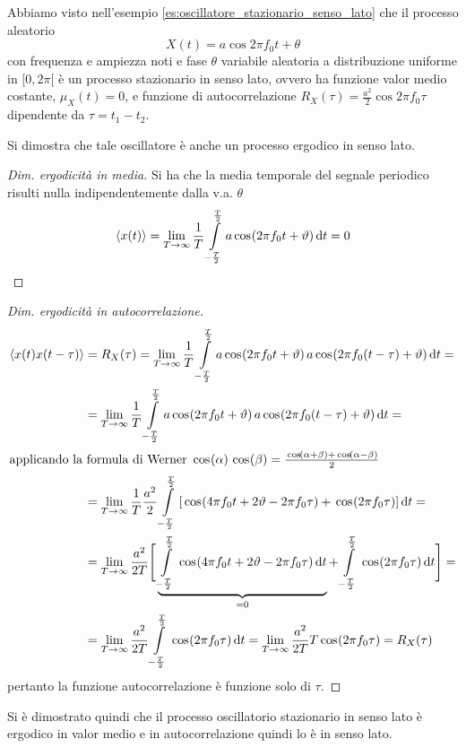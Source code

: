 \begin{esempio}
Abbiamo visto nell'esempio \ref{es:oscillatore_stazionario_senso_lato} che il processo aleatorio
\[
	X(t)=a\cos{2\pi f_0 t+\theta}
\]
con frequenza e ampiezza noti e fase $\theta$ variabile aleatoria a distribuzione uniforme in $[0,2\pi[$ è un processo stazionario in senso lato, ovvero ha funzione valor medio costante, $\mu_X(t)=0$, e funzione di autocorrelazione $R_X(\tau)=\frac{a^2}{2}\cos{2\pi f_0 \tau}$ dipendente da $\tau=t_1-t_2$.

Si dimostra che tale oscillatore è anche un processo ergodico in senso lato.
\begin{proof}[Dim. ergodicità in media]
Si ha che la media temporale del segnale periodico risulti nulla indipendentemente dalla v.a. $\theta$
\[
	\langle x(t)\rangle=\lim\limits_{T\to\infty}\frac{1}{T}\int\limits_{-\frac{T}{2}}^{\frac{T}{2}}{a\,{\operatorname{cos}}^{}\!\left({2\pi f_0 t+\vartheta}\right)}{\,\mathop{}\!\mathrm{d}{t}}=0
\]
\end{proof}

\begin{proof}[Dim. ergodicità in autocorrelazione]
\[
	\begin{split}\langle x(t)x(t-\tau)\rangle&=R_X(\tau)=\lim\limits_{T\to\infty}\frac{1}{T}\intd{-\frac{T}{2}}{\frac{T}{2}}{a\cos{2\pi f_0 t+\theta}a\cos{2\pi f_0 (t-\tau)+\theta}}{t}=\\
	&=\lim\limits_{T\to\infty}\frac{1}{T}\intd{-\frac{T}{2}}{\frac{T}{2}}{a\cos{2\pi f_0 t+\theta}a\cos{2\pi f_0 (t-\tau)+\theta}}{t}=\\
	\intertext{applicando la formula di Werner $\cos\alpha\cos\beta=\frac{\cos{\alpha+\beta}+\cos{\alpha-\beta}}{2}$}
	&=\lim\limits_{T\to\infty}\frac{1}{T}\frac{a^2}{2}\intd{-\frac{T}{2}}{\frac{T}{2}}{[\cos{4\pi f_0 t+2\theta-2\pi f_0\tau}+\cos{2\pi f_0\tau}]}{t}=\\
	&=\lim\limits_{T\to\infty}\frac{a^2}{2 T}\Bigg[\underbrace{\intd{-\frac{T}{2}}{\frac{T}{2}}{\cos{4\pi f_0 t+2\theta-2\pi f_0\tau}}{t}}_{=0}+\intd{-\frac{T}{2}}{\frac{T}{2}}{\cos{2\pi f_0\tau}}{t}\Bigg]=\\
	&=\lim\limits_{T\to\infty}\frac{a^2}{2 T}\intd{-\frac{T}{2}}{\frac{T}{2}}{\cos{2\pi f_0\tau}}{t}=\lim\limits_{T\to\infty}\frac{a^2}{2 T}T\cos{2\pi f_0\tau}=R_X(\tau)
\end{split}
\]
pertanto la funzione autocorrelazione è funzione solo di $\tau$.
\end{proof}
Si è dimostrato quindi che il processo oscillatorio stazionario in senso lato è ergodico in valor medio e in autocorrelazione quindi lo è in senso lato.
\end{esempio}

